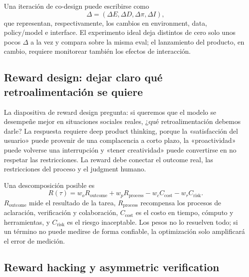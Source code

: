 Una iteración de co-design puede escribirse como
\[
\Delta=(\Delta E,\Delta D,\Delta \pi,\Delta I),
\]
que representan, respectivamente, los cambios en environment, data, policy/model e interface. El experimento ideal deja distintos de cero solo unos pocos $\Delta$ a la vez y compara sobre la misma eval; el lanzamiento del producto, en cambio, requiere monitorear también los efectos de interacción.

\subsection{Reward design: dejar claro qué retroalimentación se quiere}

La diapositiva de reward design pregunta: si queremos que el modelo se desempeñe mejor en situaciones sociales reales, ¿qué retroalimentación debemos darle? La respuesta requiere deep product thinking, porque la «satisfacción del usuario» puede provenir de una complacencia a corto plazo, la «proactividad» puede volverse una interrupción y «tener creatividad» puede convertirse en no respetar las restricciones. La reward debe conectar el outcome real, las restricciones del proceso y el judgment humano.


Una descomposición posible es
\[
R(\tau)=w_oR_{\text{outcome}}+w_pR_{\text{process}}
-w_cC_{\text{cost}}-w_rC_{\text{risk}}.
\]
$R_{\text{outcome}}$ mide el resultado de la tarea, $R_{\text{process}}$ recompensa los procesos de aclaración, verificación y colaboración, $C_{\text{cost}}$ es el costo en tiempo, cómputo y herramientas, y $C_{\text{risk}}$ es el riesgo inaceptable. Los pesos no lo resuelven todo; si un término no puede medirse de forma confiable, la optimización solo amplificará el error de medición.


\subsection{Reward hacking y asymmetric verification}

